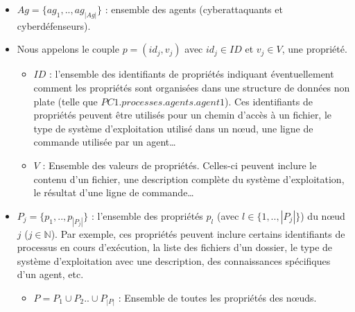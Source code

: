 \begin{itemize}

    \item $Ag = \{ag_1,..,ag_{|Ag|}\}$ : ensemble des agents (cyberattaquants et cyberdéfenseurs).

    \item Nous appelons le couple $p = (id_{j}, v_{j})$ avec $id_j \in {ID}$ et $v_j \in V$, une propriété.
          \begin{itemize}
              \item $ID$ : l'ensemble des identifiants de propriétés indiquant éventuellement comment les propriétés sont organisées dans une structure de données non plate (telle que $PC1.processes.agents.agent1$). Ces identifiants de propriétés peuvent être utilisés pour un chemin d'accès à un fichier, le type de système d'exploitation utilisé dans un nœud, une ligne de commande utilisée par un agent\dots
              \item $V$ : Ensemble des valeurs de propriétés. Celles-ci peuvent inclure le contenu d'un fichier, une description complète du système d'exploitation, le résultat d'une ligne de commande\dots
          \end{itemize}

    \item $P_{j} = \{ p_1, .., p_{|P_{j}|} \}$ : l'ensemble des propriétés $p_{l}$ (avec $l \in \{1,..,|P_{j}|\}$) du nœud $j$ ($j \in \mathbb{N} $). Par exemple, ces propriétés peuvent inclure certains identifiants de processus en cours d'exécution, la liste des fichiers d'un dossier, le type de système d'exploitation avec une description, des connaissances spécifiques d'un agent, etc.
          \begin{itemize}
              \item $P = P_1 \cup P_2 .. \cup P_{|P|} $ : Ensemble de toutes les propriétés des nœuds.
          \end{itemize}


\end{itemize}
